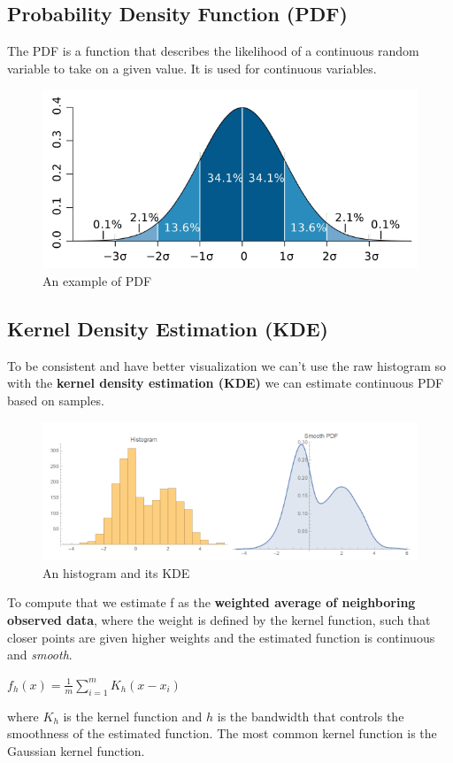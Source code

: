 \subsection{Probability Density Function (PDF)}
The PDF is a function that describes the likelihood of a continuous 
random variable to take on a given value. It is used for continuous 
variables.

\begin{figure}[H]
  \centering
  \includegraphics[scale=.60]{images/DataExplVis/pdf.png}
  \caption{An example of PDF}
  \label{fig:pdf}
\end{figure}

\subsection{Kernel Density Estimation (KDE)}
To be consistent and have better visualization we can't use the
raw histogram so with the \textbf{kernel density estimation (KDE)} we can
estimate continuous PDF based on samples.
\begin{figure}[H]
    \centering
    \includegraphics[scale=0.75]{images/DataExplVis/KernelDF.png}
    \caption{An histogram and its KDE}
    \label{fig:KDE}
\end{figure}
To compute that we estimate f as the \textbf{weighted average of
neighboring observed data}, where the weight is defined by the kernel
function, such that closer points are given higher weights and the
estimated function is continuous and \textit{smooth}.
\begin{center}
    $ f_{h}(x) = \frac{1}{m} \sum\limits_{i=1}^m K_{h} (x-x_{i})$
\end{center}
where $K_{h}$ is the kernel function and $h$ is the bandwidth that 
controls the smoothness of the estimated function. The most common
kernel function is the Gaussian kernel function.
